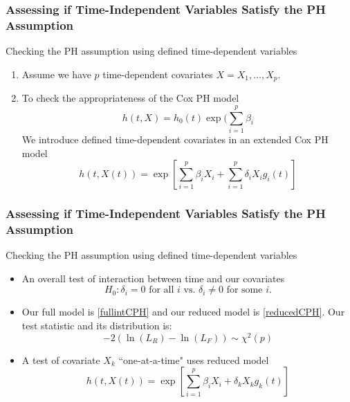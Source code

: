 \documentclass{beamer}
\theoremstyle{definition}
\begin{document}
\begin{frame}
\frametitle{Assessing if Time-Independent Variables Satisfy the PH Assumption}
\begin{block}{Checking the PH assumption using defined time-dependent variables}
\begin{enumerate}
\item Assume we have $p$ time-dependent covariates $X=X_1,\ldots,X_p$.
\item To check the appropriateness of the Cox PH model
\begin{equation} \label{reducedCPH}
h(t,X) = h_0(t)\exp(\sum_{i=1}^p \beta_i
\end{equation}
We introduce defined time-dependent covariates in an extended Cox PH model
\begin{equation} \label{fullintCPH}
h(t,X(t)) = \exp[\sum_{i=1}^p \beta_i X_i + \sum_{i=1}^p \delta_i X_i g_i(t)]
\end{equation} 
\end{enumerate}
\end{block}
\end{frame}


\begin{frame}
\frametitle{Assessing if Time-Independent Variables Satisfy the PH Assumption}
\begin{block}{Checking the PH assumption using defined time-dependent variables}
\begin{itemize}
\item An overall test of interaction between time and our covariates
\[
H_0: \delta_i = 0 \text{ for all } i \text{ vs. } \delta_i \neq 0 \text{ for some } i.
\]
\item Our full model is \eqref{fullintCPH} and our reduced model is \eqref{reducedCPH}. Our test statistic and its distribution is:
\vspace{-10pt} 
\[
-2(\ln(L_R) - \ln(L_F)) \sim \chi^2(p) 
\]
\item A test of covariate $X_k$ ``one-at-a-time" uses reduced model
\vspace{-10pt} 
\[
h(t,X(t)) = \exp[\sum_{i=1}^p \beta_i X_i + \delta_k X_k g_k(t)]
\] 
\end{itemize}
\end{block}
\end{frame}
\end{document}
